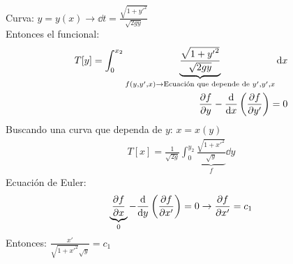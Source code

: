 \documentclass[../main]{subfiles}
\begin{document}
Curva: $\displaystyle y=y(x) \rightarrow \dd{t}=\frac{\sqrt{1+{y'}^2}}{\sqrt{2gy}}$\\
Entonces el funcional:
\begin{align*}
    T[y]=\int_{0}^{x_{2}} \underbrace{\frac{\sqrt{1+{y'}^2}}{\sqrt{2gy}}}_{f(y,y',x)\rightarrow\text{Ecuación que depende de } y',y',x}\dd{x}\\
    \pdv{f}{y}-\dv{}{x}\left(\pdv{f}{y'}\right)=0
\end{align*}
Buscando una curva que dependa de $y$: $x=x(y)$
\begin{align*}
    T[x]=\frac{1}{\sqrt{2g}}\int_{0}^{y_{2}} \underbrace{\frac{\sqrt{1+{x'}^2} }{\sqrt{y} }}_{f}\dd{y}
\end{align*}
Ecuación de Euler:
\begin{align*}
    \underbrace{\pdv{f}{x}}_{0}-\dv{}{y}\left(\pdv{f}{x'}\right)=0\rightarrow \pdv{f}{x'}=c_1
\end{align*}
Entonces: $\displaystyle \frac{x'}{\sqrt{1+{x'}^2}\sqrt{y} }=c_1$
\end{document}
